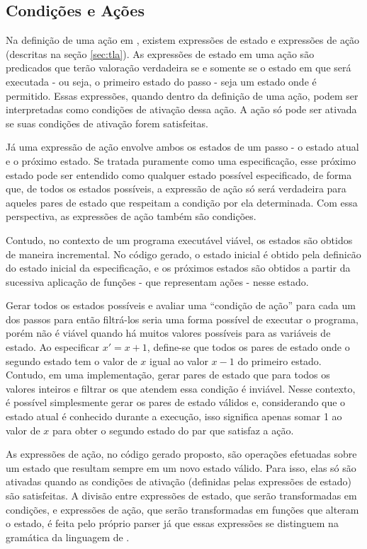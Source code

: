 \subsection{Condições e Ações}
\label{sec:condicoes}

Na definição de uma ação em \TLAA, existem expressões de estado e expressões de
ação (descritas na seção \ref{sec:tla}). As expressões de estado em uma ação
\FANCYA são predicados que terão valoração verdadeira se e somente se o estado em que \FANCYA
será executada - ou seja, o primeiro estado do passo - seja um estado onde
\FANCYA é permitido. Essas expressões, quando dentro da definição de uma ação,
podem ser interpretadas como condições de ativação dessa ação. A ação só pode ser ativada
se suas condições de ativação forem satisfeitas.

Já uma expressão de ação envolve ambos os estados de um passo - o estado atual e
o próximo estado. Se tratada puramente como uma especificação, esse próximo
estado pode ser entendido como qualquer estado possível especificado, de forma
que, de todos os estados possíveis, a expressão de ação só será verdadeira para
aqueles pares de estado que respeitam a condição por ela determinada. Com essa
perspectiva, as expressões de ação também são condições.

Contudo, no contexto de um programa executável viável, os estados são obtidos de
maneira incremental. No código gerado, o estado inicial é obtido pela definicão
do estado inicial da especificação, e os próximos estados são obtidos a partir
da sucessiva aplicação de funções - que representam ações - nesse estado.

Gerar todos os estados possíveis e avaliar uma ``condição de ação'' para cada um dos
passos para então filtrá-los seria uma forma possível de executar o programa, porém
não é viável quando há muitos valores possíveis para as variáveis de estado. Ao
especificar $x' = x + 1$, define-se que todos os pares de estado onde o segundo estado tem o
valor de $x$ igual ao valor $x - 1$ do primeiro estado. Contudo, em uma
implementação, gerar pares de estado que para todos os valores
inteiros e filtrar os que atendem essa condição é
inviável. Nesse contexto, é possível simplesmente gerar os pares de estado válidos e,
considerando que o estado atual é conhecido durante a execução, isso significa apenas
somar 1 ao valor de $x$ para obter o segundo estado do par que satisfaz a ação.

As expressões de ação, no código gerado proposto, são operações efetuadas sobre
um estado que resultam sempre em um novo estado válido. Para isso, elas só são
ativadas quando as condições de ativação (definidas pelas expressões
de estado) são satisfeitas. A divisão
entre expressões de estado, que serão transformadas em condições, e expressões de
ação, que serão transformadas em funções que alteram o estado, é feita pelo
próprio parser já que essas expressões se distinguem na gramática da linguagem
de \TLAA.

